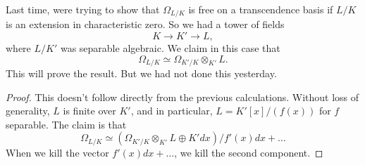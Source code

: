 Last time, were trying to show that $\Omega_{L/K}$ is free on a transcendence
basis if $L/K$ is an extension in characteristic zero. So we had a tower of fields
\[ K \to K' \to L,  \]
where $L/K'$ was separable algebraic. 
We claim in this case that
\[ \Omega_{L/K} \simeq \Omega_{K'/K} \otimes_{K'} L.  \]
This will prove the result. But we had not done this yesterday.
\begin{proof} 
This doesn't follow directly from the previous calculations. Without loss of generality, $L$ is
finite over $K'$, and in particular, $L = K'[x]/(f(x))$ for $f$ separable. The claim is that
\[ \Omega_{L/K} \simeq (\Omega_{K'/K}\otimes_{K'}L \oplus K' dx)/f'(x)dx + \dots  \]
When we kill the vector $f'(x) dx + \dots$, we kill the second component. 
\end{proof} 



